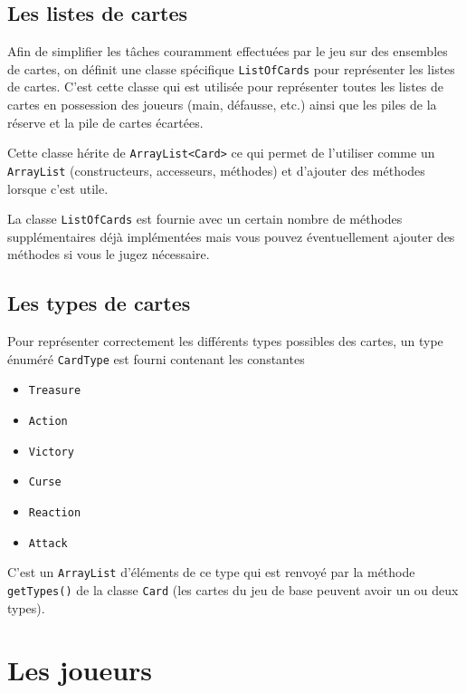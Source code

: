 \documentclass[12pt]{td}
\begin{document}
\subsection{Les listes de cartes}

Afin de simplifier les tâches couramment effectuées par le jeu sur des ensembles de cartes, on définit une classe spécifique \texttt{ListOfCards} pour représenter les listes de cartes. C'est cette classe qui est utilisée pour représenter toutes les listes de cartes en possession des joueurs (main, défausse, etc.) ainsi que les piles de la réserve et la pile de cartes écartées.

Cette classe hérite de \texttt{ArrayList<Card>} ce qui permet de l'utiliser comme un \texttt{ArrayList} (constructeurs, accesseurs, méthodes) et d'ajouter des méthodes lorsque c'est utile.

La classe \texttt{ListOfCards} est fournie avec un certain nombre de méthodes supplémentaires déjà implémentées mais vous pouvez éventuellement ajouter des méthodes si vous le jugez nécessaire.

\subsection{Les types de cartes}

Pour représenter correctement les différents types possibles des cartes, un type énuméré \texttt{CardType} est fourni contenant les constantes
\begin{itemize}
	\item \texttt{Treasure}
	\item \texttt{Action}
	\item \texttt{Victory}
	\item \texttt{Curse}
	\item \texttt{Reaction}
	\item \texttt{Attack}
\end{itemize}

C'est un \texttt{ArrayList} d'éléments de ce type qui est renvoyé par la méthode \texttt{getTypes()} de la classe \texttt{Card} (les cartes du jeu de base peuvent avoir un ou deux types).


\section{Les joueurs}
\end{document}
